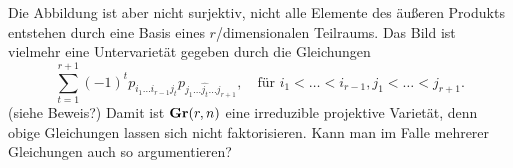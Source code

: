 Die Abbildung ist aber nicht surjektiv, nicht alle Elemente des äußeren Produkts entstehen durch eine Basis eines $r$\-/dimensionalen Teilraums. Das Bild ist vielmehr eine Untervarietät gegeben durch die Gleichungen
\begin{equation}
\sum_{t=1}^{r+1} (-1)^t p_{i_1 \dots i_{r-1} j_t} p_{j_1 \dots \hat{j_t} \dots j_{r+1}}, \quad\text{für } i_1 < \dots < i_{r-1}, j_1 < \dots < j_{r+1}.
\end{equation}
(siehe \cite[S.~42]{Shafarevich} \note Beweis?) Damit ist $\grass r/n$ eine irreduzible projektive Varietät, denn obige Gleichungen lassen sich nicht faktorisieren. \note Kann man im Falle mehrerer Gleichungen auch so argumentieren?
